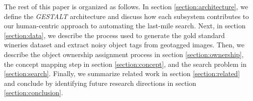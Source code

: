 The rest of this paper is organized as follows.  In section \ref{section:architecture}, we define the \emph{GESTALT} architecture and discuss how each subsystem contributes to our human-centric approach to automating the last-mile search. 
Next, in section \ref{section:data}, we describe the process used to generate the gold standard wineries dataset and extract noisy object tags from geotagged images. Then, we describe the object ownership assignment process in section \ref{section:ownership}, the concept mapping step in section \ref{section:concept}, and the search problem in \ref{section:search}. 
Finally, we summarize related work in section \ref{section:related} and conclude by identifying future research directions in section \ref{section:conclusion}.






